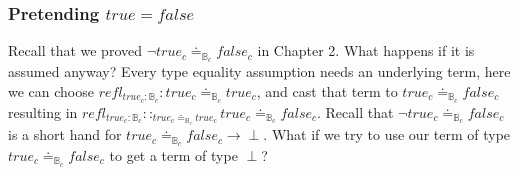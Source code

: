 \subsubsection{Pretending $true=false$}

Recall that we proved $\lnot true_{c}\doteq_{\mathbb{B}_{c}}false_{c}$
in Chapter 2. What happens if it is assumed anyway? Every type equality
assumption needs an underlying term, here we can choose $refl_{true_{c}:\mathbb{B}_{c}}:true_{c}\doteq_{\mathbb{B}_{c}}true_{c}$,
and cast that term to $true_{c}\doteq_{\mathbb{B}_{c}}false_{c}$
resulting in $refl_{true_{c}:\mathbb{B}_{c}}::_{true_{c}\doteq_{\mathbb{B}_{c}}true_{c}}true_{c}\doteq_{\mathbb{B}_{c}}false_{c}$.
Recall that $\lnot true_{c}\doteq_{\mathbb{B}_{c}}false_{c}$ is a
short hand for $true_{c}\doteq_{\mathbb{B}_{c}}false_{c}\rightarrow\perp$.
What if we try to use our term of type $true_{c}\doteq_{\mathbb{B}_{c}}false_{c}$
to get a term of type $\perp$?


